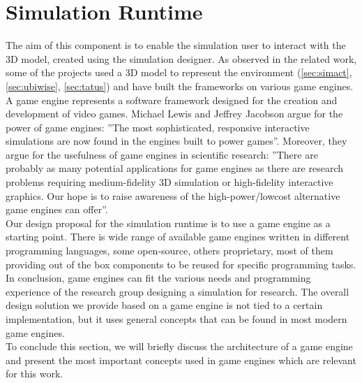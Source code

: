 \section{Simulation Runtime} %
\label{sec:simulation_runtime}
The aim of this component is to enable the simulation user to interact with the 3D model, created using the simulation designer. As observed in the related work, some of the projects used a 3D model to represent the environment (\ref{sec:simact}, \ref{sec:ubiwise}, \ref{sec:tatus}) and have built the frameworks on various game engines. A game engine represents a software framework designed for the creation and development of video games. Michael Lewis and Jeffrey Jacobson \cite{lewis2002game} argue for the power of game engines: ''The most sophisticated, responsive interactive simulations are now found in the engines built to power games''. Moreover, they argue for the usefulness of game engines in scientific research: ''There are probably as many potential applications for game engines as there are research problems requiring medium-fidelity 3D simulation or high-fidelity interactive graphics. Our hope is to raise awareness of the high-power/lowcost alternative game engines can offer''.\\

Our design proposal for the simulation runtime is to use a game engine as a starting point. There is wide range of available game engines written in different programming languages, some open-source, others proprietary, most of them providing out of the box components to be reused for specific programming tasks. In conclusion, game engines can fit the various needs and programming experience of the research group designing a simulation for research. The overall design solution we provide based on a game engine is not tied to a certain implementation, but it uses general concepts that can be found in most modern game engines.\\

To conclude this section, we will briefly discuss the architecture of a game engine and present the most important concepts used in game engines which are relevant for this work.\\

